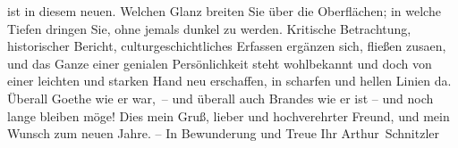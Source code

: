                   \introOben{}ist\introOben{} in diesem neuen. Welchen Glanz breiten Sie über die
               Oberflächen; in welche Tiefen dringen Sie, ohne jemals dunkel zu werden. {\pb}Kritische Betrachtung, historischer Bericht,
               culturgeschichtliches Erfassen ergänzen sich, fließen zusa{\geminationm}en, und das Ganze einer genialen Persönlichkeit steht
               wohlbekannt und doch von einer leichten und starken Hand neu erschaffen, in scharfen
               und hellen Linien da. Überall Goethe wie er
               war, – und überall auch Brandes wie er ist – und noch lange bleiben möge! Dies mein
               Gruß, lieber und hochverehrter Freund, und mein Wunsch zum neuen Jahre. – In
               Bewunderung und Treue\pend
           \pstart Ihr \spacefill\mbox{Arthur Schnitzler}\pend{}\endnumbering{}  
      